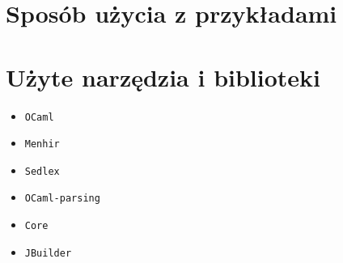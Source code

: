 \documentclass[declaration,shortabstract]{iithesis}
\begin{document}










\section{Sposób użycia z przykładami}

\section{Użyte narzędzia i biblioteki}

\begin{itemize}
  \item \texttt{OCaml}
  \item \texttt{Menhir}
  \item \texttt{Sedlex}
  \item \texttt{OCaml-parsing}
  \item \texttt{Core} 
  \item \texttt{JBuilder} 
\end{itemize}


\end{document}
